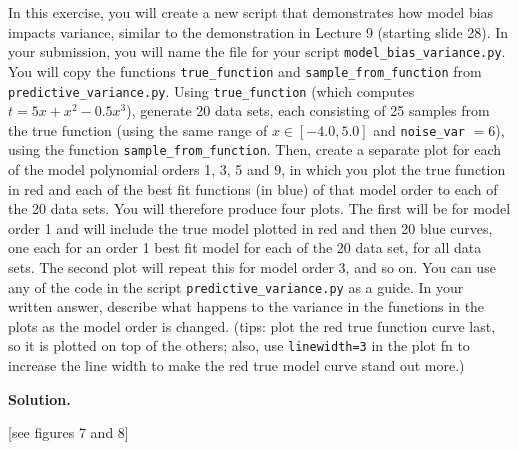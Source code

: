 \documentclass[10pt]{article}
\begin{document}
\begin{itemize}
In this exercise, you will create a new script that demonstrates how model bias impacts variance, similar to the demonstration in Lecture 9 (starting slide 28).  In your submission, you will name the file for your script {\tt model\_bias\_variance.py}.  You will copy the functions {\tt true\_function} and {\tt sample\_from\_function} from {\tt predictive\_variance.py}.  Using {\tt true\_function} (which computes $t = 5x + x^2 - 0.5x^3$), generate 20 data sets, each consisting of 25 samples from the true function (using the same range of $x \in [-4.0, 5.0]$ and {\tt noise\_var} $= 6$), using the function {\tt sample\_from\_function}.  Then, create a separate plot for each of the model polynomial orders 1, 3, 5 and 9, in which you plot the true function in red and each of the best fit functions (in blue) of that model order to each of the 20 data sets.  You will therefore produce four plots.  The first will be for model order 1 and will include the true model plotted in red and then 20 blue curves, one each for an order 1 best fit model for each of the 20 data set, for all data sets.  The second plot will repeat this for model order 3, and so on.  You can use any of the code in the script {\tt predictive\_variance.py} as a guide.  In your written answer, describe what happens to the variance in the functions in the plots as the model order is changed.  (tips: plot the red true function curve last, so it is plotted on top of the others; also, use {\tt linewidth=3} in the plot fn to increase the line width to make the red true model curve stand out more.)

{\bf Solution.} 

[see figures 7 and 8]


\end{itemize}
\end{document}
